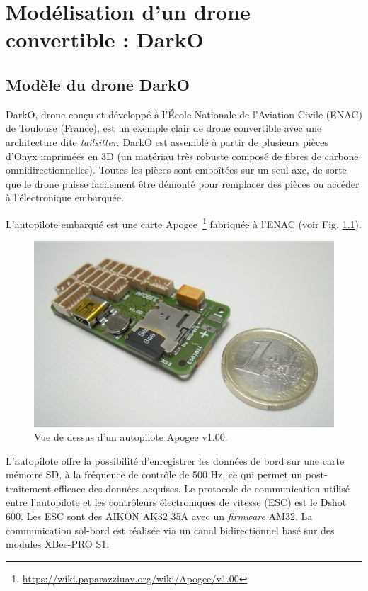 \chapter{Modélisation d'un drone convertible : DarkO}
\minitoc
\label{chap:model}

\section{Modèle du drone DarkO}
\label{sec:model}
DarkO, drone conçu et développé à l'École Nationale de l'Aviation Civile (ENAC)  de Toulouse (France), est un exemple clair de drone convertible avec une architecture dite \textit{tailsitter}.
DarkO est assemblé à partir de plusieurs pièces d'Onyx imprimées en 3D (un matériau très robuste composé de fibres de carbone omnidirectionnelles). Toutes les pièces sont emboîtées sur un seul axe, de sorte que le drone puisse facilement être démonté pour remplacer des pièces ou accéder à l'électronique embarquée. 

L'autopilote embarqué est une carte Apogee~\footnote{\url{https://wiki.paparazziuav.org/wiki/Apogee/v1.00}} fabriquée à l'ENAC (voir Fig. \ref{fig:apogee}). 


\begin{figure}[ht!]
    \centering
        \includegraphics[width=0.5\columnwidth]{figures/800px-Apogee_v100_top_1E.jpeg}
        \caption{Vue de dessus d'un autopilote Apogee v1.00.}
        \label{fig:apogee}
\end{figure}

L'autopilote offre la possibilité d'enregistrer les données de bord sur une carte mémoire SD, à la fréquence de contrôle de 500 Hz, ce qui permet un post-traitement efficace des données acquises. Le protocole de communication utilisé entre l'autopilote et les contrôleurs électroniques de vitesse (ESC) est le Dshot 600. Les ESC sont des AIKON AK32 35A avec un \textit{firmware} AM32. La communication sol-bord est réalisée via un canal bidirectionnel basé sur des modules XBee-PRO S1.

